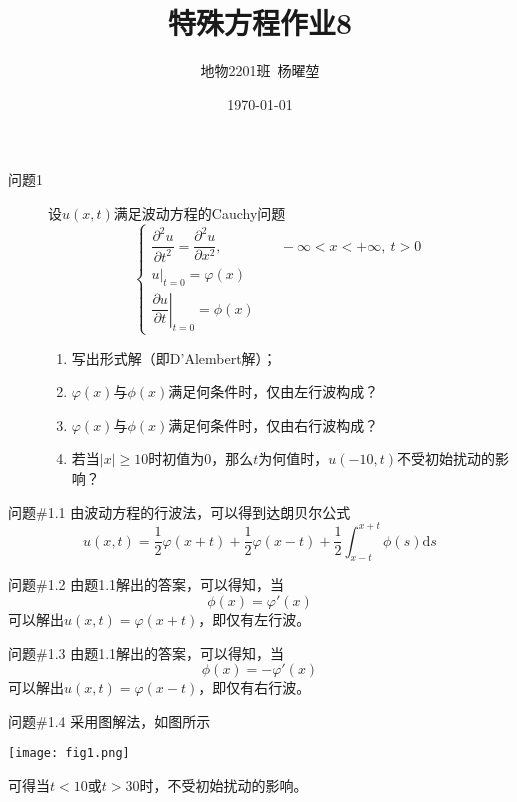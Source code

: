 \documentclass[12pt]{ctexart}
\title{特殊方程作业8}
\author{地物2201班\ 杨曜堃}
\date{\today}
\begin{document}
    \markboth{\theauthor}{\thetitle}
    \maketitle
    \begin{description}
        \item[问题1] 设$u(x,t)$满足波动方程的Cauchy问题$$
        \begin{cases}
            \dfrac{\partial^2u}{\partial t^2}=\dfrac{\partial^2u}{\partial x^2},&\quad-\infty<x<+\infty,\ t>0\\
            u|_{t=0}=\varphi(x)\\
            \left.\dfrac{\partial u}{\partial t}\right|_{t=0}=\phi(x)
        \end{cases}
        $$
        \begin{enumerate}
            \item 写出形式解（即D'Alembert解）；
            \item $\varphi(x)$与$\phi(x)$满足何条件时，仅由左行波构成？
            \item $\varphi(x)$与$\phi(x)$满足何条件时，仅由右行波构成？
            \item 若当$|x|\geqslant10$时初值为0，那么$t$为何值时，$u(-10,t)$不受初始扰动的影响？
        \end{enumerate}
    \end{description}
    \begin{problem}{问题\#1.1}
        由波动方程的行波法，可以得到达朗贝尔公式
        $$
        u(x,t)=\dfrac{1}{2}\varphi(x+t)+\dfrac{1}{2}\varphi(x-t)+\dfrac{1}{2}\int^{x+t}_{x-t}\phi(s)\text{d}s
        $$
    \end{problem}
    \begin{problem}{问题\#1.2}
        由题1.1解出的答案，可以得知，当
        $$
        \phi(x)=\varphi'(x)
        $$
        可以解出$u(x,t)=\varphi(x+t)$，即仅有左行波。
    \end{problem}
    \begin{problem}{问题\#1.3}
        由题1.1解出的答案，可以得知，当
        $$
        \phi(x)=-\varphi'(x)
        $$
        可以解出$u(x,t)=\varphi(x-t)$，即仅有右行波。
    \end{problem}
    \begin{problem}{问题\#1.4}
        采用图解法，如图所示
        \begin{center}
            \texttt{[image: fig1.png]}
        \end{center}
        可得当$t<10$或$t>30$时，不受初始扰动的影响。
    \end{problem}
\end{document}
